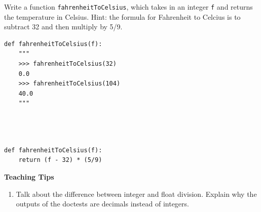\begin{blocksection}
\question Write a function \lstinline$fahrenheitToCelsius$, which takes in an integer \lstinline$f$ and returns the temperature in Celsius.
Hint: the formula for Fahrenheit to Celcius is to subtract 32 and then multiply by 5/9.

\begin{lstlisting}
def fahrenheitToCelsius(f):
    """
    >>> fahrenheitToCelsius(32)
    0.0
    >>> fahrenheitToCelsius(104)
    40.0
    """



\end{lstlisting}

\begin{solution}
\begin{lstlisting}

def fahrenheitToCelsius(f):
    return (f - 32) * (5/9)

\end{lstlisting}
\end{solution}

\begin{blocksection}
    \begin{meta}
    \textbf{Teaching Tips}
    \begin{enumerate}
            \item Talk about the difference between integer and float division. Explain why the outputs of the doctests are decimals instead of integers.
    \end{enumerate}
    \end{meta}
\end{blocksection}

\end{blocksection}
